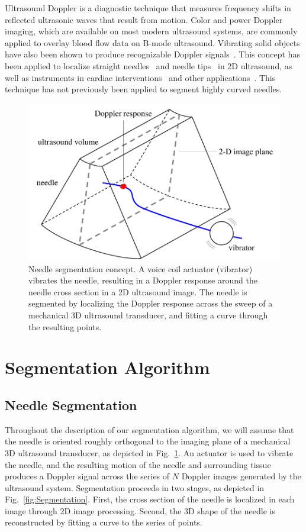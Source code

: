 Ultrasound Doppler is a diagnostic technique that measures frequency shifts in reflected ultrasonic waves that result from motion. Color and power Doppler imaging, which are available on most modern ultrasound systems, are commonly applied to overlay blood flow data on B-mode ultrasound. Vibrating solid objects have also been shown to produce recognizable Doppler signals~\cite{Holen1985}. This concept has been applied to localize straight needles~\cite{Armstrong2001,Feld1997,Hamper1991} and needle tips~\cite{Harmat2006} in 2D ultrasound, as well as instruments in cardiac interventions~\cite{Fronheiser2008,Reddy2008} and other applications~\cite{McAleavey2003,Rogers2009}. This technique has not previously been applied to segment highly curved needles.

\begin{figure}[!t]
\centering
\includegraphics[width = 0.75\columnwidth]{Images/Chapter2/SliceConcept/SliceConcept}%
\caption[3D ultrasound segmentation concept]{Needle segmentation concept. A voice coil actuator (vibrator) vibrates the needle, resulting in a Doppler response around the needle cross section in a 2D ultrasound image. The needle is segmented by localizing the Doppler response across the sweep of a mechanical 3D ultrasound transducer, and fitting a curve through the resulting points.}
\label{fig:SliceConcept}
\end{figure}

\section{Segmentation Algorithm}
\label{sec:Algorithms}
\subsection{Needle Segmentation}
Throughout the description of our segmentation algorithm, we will assume that the needle is oriented roughly orthogonal to the imaging plane of a mechanical 3D ultrasound transducer, as depicted in Fig.~\ref{fig:SliceConcept}. An actuator is used to vibrate the needle, and the resulting motion of the needle and surrounding tissue produces a Doppler signal across the series of $N$ Doppler images generated by the ultrasound system. Segmentation proceeds in two stages, as depicted in Fig.~\ref{fig:Segmentation}. First, the cross section of the needle is localized in each image through 2D image processing. Second, the 3D shape of the needle is reconstructed by fitting a curve to the series of points.

